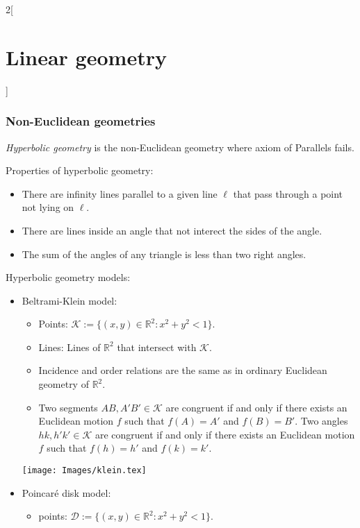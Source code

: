 \documentclass[class=article,10pt,crop=false]{standalone}
\begin{document}
\begin{multicols}{2}[\section{Linear geometry}]
\subsubsection*{Non-Euclidean geometries}
\begin{definition}
\textit{Hyperbolic geometry} is the non-Euclidean geometry where axiom of Parallels fails.
\end{definition}
\begin{prop}
Properties of hyperbolic geometry:
\begin{itemize}
    \item There are infinity lines parallel to a given line $\ell$ that pass through a point not lying on $\ell$.
    \item There are lines inside an angle that not interect the sides of the angle.
    \item The sum of the angles of any triangle is less than two right angles.
\end{itemize}
\end{prop}
\begin{definition}
Hyperbolic geometry models:
\begin{itemize}
    \item Beltrami-Klein model:
    \begin{itemize}
        \item Points: $\mathcal{K}:=\{(x,y)\in\mathbb{R}^2:x^2+y^2<1\}$.
        \item Lines: Lines of $\mathbb{R}^2$ that intersect with $\mathcal{K}$.
        \item Incidence and order relations are the same as in ordinary Euclidean geometry of $\mathbb{R}^2$.
        \item Two segments $AB,A'B'\in\mathcal{K}$ are congruent if and only if there exists an Euclidean motion $f$ such that $f(A)=A'$ and $f(B)=B'$. Two angles $hk,h'k'\in\mathcal{K}$ are congruent if and only if there exists an Euclidean motion $f$ such that $f(h)=h'$ and $f(k)=k'$.
    \end{itemize}
    \begin{minipage}{\linewidth} 
        \centering
        \texttt{[image: Images/klein.tex]} 
    \end{minipage} 
    \item Poincaré disk model:
    \begin{itemize}
        \item points: $\mathcal{D}:=\{(x,y)\in\mathbb{R}^2:x^2+y^2<1\}$.

\end{itemize}
\end{itemize}
\end{definition}
\end{multicols}
\end{document}
